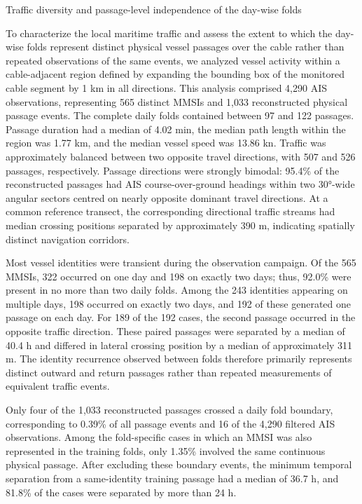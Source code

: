 Traffic diversity and passage-level independence of the day-wise folds


To characterize the local maritime traffic and assess the extent to which the day-wise folds represent distinct physical vessel passages over the cable rather than repeated observations of the same events, we analyzed vessel activity within a cable-adjacent region defined by expanding the bounding box of the monitored cable segment by 1 km in all directions. This analysis comprised 4,290 AIS observations, representing 565 distinct MMSIs and 1,033 reconstructed physical passage events. The complete daily folds contained between 97 and 122 passages. Passage duration had a median of 4.02 min, the median path length within the region was 1.77 km, and the median vessel speed was 13.86 kn. Traffic was approximately balanced between two opposite travel directions, with 507 and 526 passages, respectively. Passage directions were strongly bimodal: 95.4\% of the reconstructed passages had AIS course-over-ground headings within two 30°-wide angular sectors centred on nearly opposite dominant travel directions. At a common reference transect, the corresponding directional traffic streams had median crossing positions separated by approximately 390 m, indicating spatially distinct navigation corridors.

Most vessel identities were transient during the observation campaign. Of the 565 MMSIs, 322 occurred on one day and 198 on exactly two days; thus, 92.0\% were present in no more than two daily folds. Among the 243 identities appearing on multiple days, 198 occurred on exactly two days, and 192 of these generated one passage on each day. For 189 of the 192 cases, the second passage occurred in the opposite traffic direction. These paired passages were separated by a median of 40.4 h and differed in lateral crossing position by a median of approximately 311 m. The identity recurrence observed between folds therefore primarily represents distinct outward and return passages rather than repeated measurements of equivalent traffic events.

Only four of the 1,033 reconstructed passages crossed a daily fold boundary, corresponding to 0.39\% of all passage events and 16 of the 4,290 filtered AIS observations. Among the fold-specific cases in which an MMSI was also represented in the training folds, only 1.35\% involved the same continuous physical passage. After excluding these boundary events, the minimum temporal separation from a same-identity training passage had a median of 36.7 h, and 81.8\% of the cases were separated by more than 24 h.


